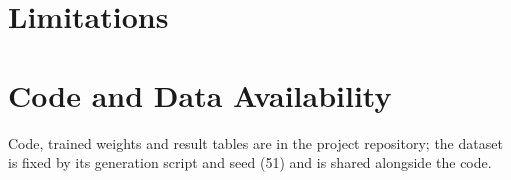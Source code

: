 \documentclass[journal]{IEEEtran}
\begin{document}
\section{Limitations}\label{sec:limitations}


\section*{Code and Data Availability}
Code, trained weights and result tables are in the project repository; the dataset is fixed by its
generation script and seed (51) and is shared alongside the code.

\appendices




\end{document}
